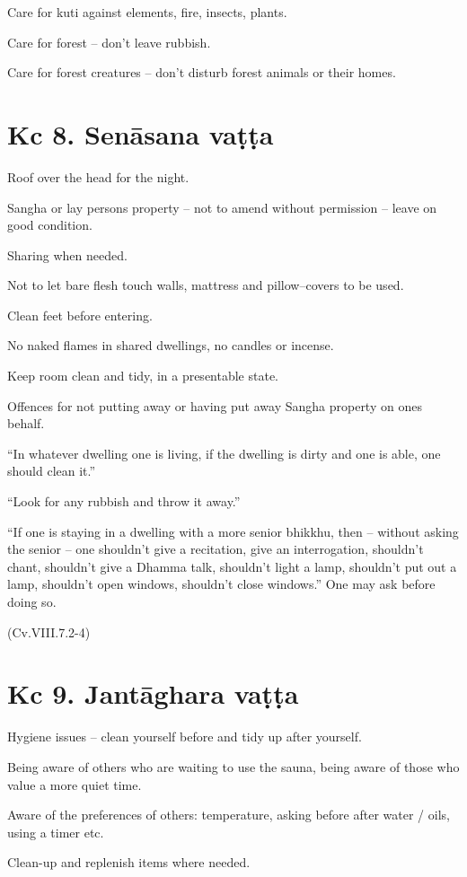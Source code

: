 Care for kuti against elements, fire, insects, plants.

Care for forest -- don't leave rubbish.

Care for forest creatures -- don't disturb forest animals or their
homes.

\section{Kc 8. Senāsana vaṭṭa}

Roof over the head for the night.

Sangha or lay persons property -- not to amend without permission --
leave on good condition.

Sharing when needed.

Not to let bare flesh touch walls, mattress and pillow--covers to be
used.

Clean feet before entering.

No naked flames in shared dwellings, no candles or incense.

Keep room clean and tidy, in a presentable state.

Offences for not putting away or having put away Sangha property on ones
behalf.

``In whatever dwelling one is living, if the dwelling is dirty and one
is able, one should clean it.''

``Look for any rubbish and throw it away.''

``If one is staying in a dwelling with a more senior bhikkhu, then --
without asking the senior -- one shouldn't give a recitation, give an
interrogation, shouldn't chant, shouldn't give a Dhamma talk, shouldn't
light a lamp, shouldn't put out a lamp, shouldn't open windows,
shouldn't close windows.'' One may ask before doing so.

(Cv.VIII.7.2-4)

\section{Kc 9. Jantāghara vaṭṭa}

Hygiene issues -- clean yourself before and tidy up after yourself.

Being aware of others who are waiting to use the sauna, being aware of
those who value a more quiet time.

Aware of the preferences of others: temperature, asking before after
water / oils, using a timer etc.

Clean-up and replenish items where needed.


